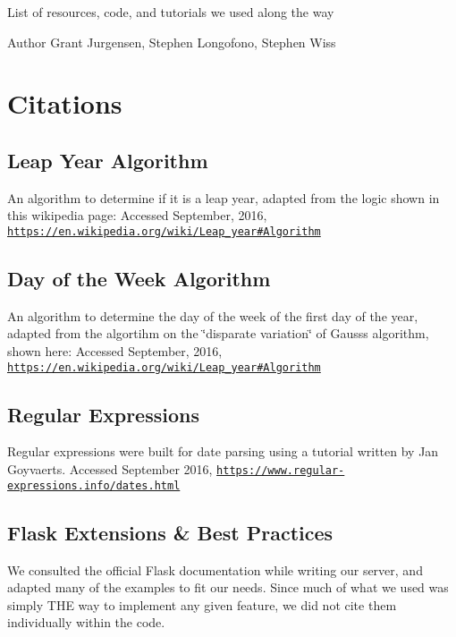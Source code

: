 List of resources, code, and tutorials we used along the way

\begin{DoxyAuthor}{Author}
Grant Jurgensen, Stephen Longofono, Stephen Wiss
\end{DoxyAuthor}
\hypertarget{Citations_Citations}{}\section{Citations}\label{Citations_Citations}
\hypertarget{Citations_one}{}\subsection{Leap Year Algorithm}\label{Citations_one}
An algorithm to determine if it is a leap year, adapted from the logic shown in this wikipedia page\+: Accessed September, 2016, \href{https://en.wikipedia.org/wiki/Leap_year#Algorithm}{\tt https\+://en.\+wikipedia.\+org/wiki/\+Leap\+\_\+year\#\+Algorithm}\hypertarget{Citations_two}{}\subsection{Day of the Week Algorithm}\label{Citations_two}
An algorithm to determine the day of the week of the first day of the year, adapted from the algortihm on the \char`\"{}disparate variation\char`\"{} of Gauss\textquotesingle{}s algorithm, shown here\+: Accessed September, 2016, \href{https://en.wikipedia.org/wiki/Leap_year#Algorithm}{\tt https\+://en.\+wikipedia.\+org/wiki/\+Leap\+\_\+year\#\+Algorithm}\hypertarget{Citations_three}{}\subsection{Regular Expressions}\label{Citations_three}
Regular expressions were built for date parsing using a tutorial written by Jan Goyvaerts. Accessed September 2016, \href{https://www.regular-expressions.info/dates.html}{\tt https\+://www.\+regular-\/expressions.\+info/dates.\+html}\hypertarget{Citations_four}{}\subsection{Flask Extensions \& Best Practices}\label{Citations_four}
We consulted the official Flask documentation while writing our server, and adapted many of the examples to fit our needs. Since much of what we used was simply T\+HE way to implement any given feature, we did not cite them individually within the code.

